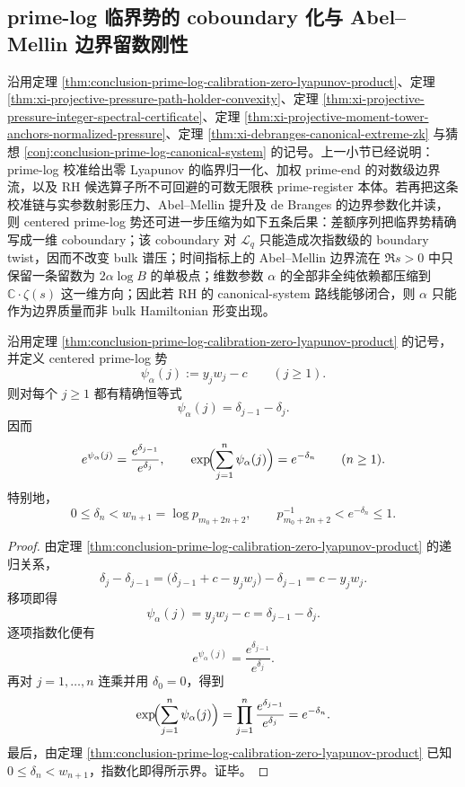 \subsection{prime-log 临界势的 coboundary 化与 Abel--Mellin 边界留数刚性}\label{subsec:conclusion-prime-log-coboundary-abel-mellin-rigidity}
沿用定理 \ref{thm:conclusion-prime-log-calibration-zero-lyapunov-product}、定理 \ref{thm:xi-projective-pressure-path-holder-convexity}、定理 \ref{thm:xi-projective-pressure-integer-spectral-certificate}、定理 \ref{thm:xi-projective-moment-tower-anchors-normalized-pressure}、定理 \ref{thm:xi-debranges-canonical-extreme-zk} 与猜想 \ref{conj:conclusion-prime-log-canonical-system} 的记号。上一小节已经说明：prime-log 校准给出零 Lyapunov 的临界归一化、加权 prime-end 的对数级边界流，以及 RH 候选算子所不可回避的可数无限秩 prime-register 本体。若再把这条校准链与实参数射影压力、Abel--Mellin 提升及 de Branges 的边界参数化并读，则 centered prime-log 势还可进一步压缩为如下五条后果：差额序列把临界势精确写成一维 coboundary；该 coboundary 对 \(\mathcal L_q\) 只能造成次指数级的 boundary twist，因而不改变 bulk 谱压；时间指标上的 Abel--Mellin 边界流在 \(\Re s>0\) 中只保留一条留数为 \(2\alpha\log B\) 的单极点；维数参数 \(\alpha\) 的全部非全纯依赖都压缩到 \(\mathbb C\cdot \zeta(s)\) 这一维方向；因此若 RH 的 canonical-system 路线能够闭合，则 \(\alpha\) 只能作为边界质量而非 bulk Hamiltonian 形变出现。

\begin{theorem}\label{thm:conclusion-prime-log-exact-coboundary}
沿用定理 \ref{thm:conclusion-prime-log-calibration-zero-lyapunov-product} 的记号，并定义 centered prime-log 势
\[
\psi_\alpha(j):=y_jw_j-c
\qquad (j\ge 1).
\]
则对每个 \(j\ge 1\) 都有精确恒等式
\[
\psi_\alpha(j)=\delta_{j-1}-\delta_j.
\]
因而
\[
e^{\psi_\alpha(j)}=\frac{e^{\delta_{j-1}}}{e^{\delta_j}},
\qquad
\exp\!\Bigl(\sum_{j=1}^{n}\psi_\alpha(j)\Bigr)=e^{-\delta_n}
\qquad (n\ge 1).
\]
特别地，
\[
0\le \delta_n<w_{n+1}=\log p_{m_0+2n+2},
\qquad
p_{m_0+2n+2}^{-1}<e^{-\delta_n}\le 1.
\]
\end{theorem}
\begin{proof}
由定理 \ref{thm:conclusion-prime-log-calibration-zero-lyapunov-product} 的递归关系，
\[
\delta_j-\delta_{j-1}
=
\bigl(\delta_{j-1}+c-y_jw_j\bigr)-\delta_{j-1}
=
c-y_jw_j.
\]
移项即得
\[
\psi_\alpha(j)=y_jw_j-c=\delta_{j-1}-\delta_j.
\]
逐项指数化便有
\[
e^{\psi_\alpha(j)}=\frac{e^{\delta_{j-1}}}{e^{\delta_j}}.
\]
再对 \(j=1,\dots,n\) 连乘并用 \(\delta_0=0\)，得到
\[
\exp\!\Bigl(\sum_{j=1}^{n}\psi_\alpha(j)\Bigr)
=
\prod_{j=1}^{n}\frac{e^{\delta_{j-1}}}{e^{\delta_j}}
=
e^{-\delta_n}.
\]
最后，由定理 \ref{thm:conclusion-prime-log-calibration-zero-lyapunov-product} 已知
\(
0\le \delta_n<w_{n+1}
\)，指数化即得所示界。证毕。
\end{proof}

